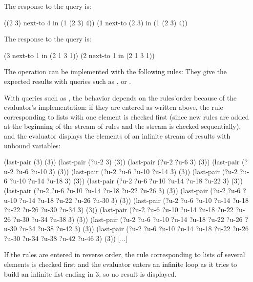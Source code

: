 \begin{exe}[4.61]
    The response to the query  is:
    \begin{cscm}
        ((2 3) next-to 4 in (1 (2 3) 4))
        (1 next-to (2 3) in (1 (2 3) 4))
    \end{cscm}
    The response to the query  is:
    \begin{cscm}
        (3 next-to 1 in (2 1 3 1))
        (2 next-to 1 in (2 1 3 1))
    \end{cscm}
\end{exe}

\begin{exe}[4.62]
    The operation can be implemented with the following rules:
    They give the expected results with queries such as
    ,\linebreak
     or
    .

    With queries such as , the behavior depends on the 
    rules’order because of the evaluator’s implementation: if they are entered 
    as written above, the rule corresponding to lists with one element is 
    checked first (since new rules are added at the beginning of the stream of 
    rules and the stream is checked sequentially), and the evaluator displays 
    the elements of an infinite stream of results with unbound variables:
    \begin{cscm}
        (last-pair (3) (3))
        (last-pair (?u-2 3) (3))
        (last-pair (?u-2 ?u-6 3) (3))
        (last-pair (?u-2 ?u-6 ?u-10 3) (3))
        (last-pair (?u-2 ?u-6 ?u-10 ?u-14 3) (3))
        (last-pair (?u-2 ?u-6 ?u-10 ?u-14 ?u-18 3) (3))
        (last-pair (?u-2 ?u-6 ?u-10 ?u-14 ?u-18 ?u-22 3) (3))
        (last-pair (?u-2 ?u-6 ?u-10 ?u-14 ?u-18 ?u-22 ?u-26 3) (3))
        (last-pair (?u-2 ?u-6 ?u-10 ?u-14 ?u-18 ?u-22 ?u-26 ?u-30 3) (3))
        (last-pair (?u-2 ?u-6 ?u-10 ?u-14 ?u-18 ?u-22 ?u-26 ?u-30 ?u-34 3) (3))
        (last-pair (?u-2 ?u-6 ?u-10 ?u-14 ?u-18 ?u-22 ?u-26 ?u-30 ?u-34 ?u-38 3) 
                (3))
        (last-pair (?u-2 ?u-6 ?u-10 ?u-14 ?u-18 ?u-22 ?u-26 ?u-30 ?u-34 ?u-38 
                ?u-42 3) (3))
        (last-pair (?u-2 ?u-6 ?u-10 ?u-14 ?u-18 ?u-22 ?u-26 ?u-30 ?u-34 ?u-38 
                ?u-42 ?u-46 3) (3))
        [...]
    \end{cscm}
    If the rules are entered in reverse order, the rule corresponding to lists 
    of several elements is checked first and the evaluator enters an infinite 
    loop as it tries to build an infinite list ending in 3, so no result is 
    displayed.
\end{exe}

